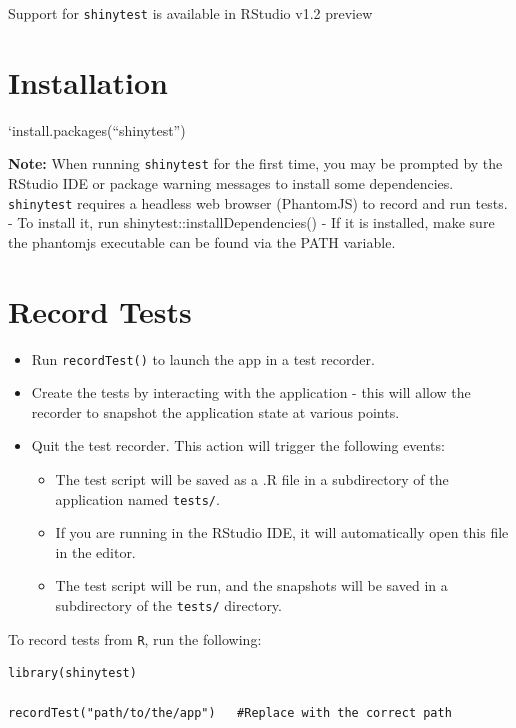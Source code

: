 \documentclass[]{book}
\providecommand{\tightlist}{%
  \setlength{\itemsep}{0pt}\setlength{\parskip}{0pt}}
\theoremstyle{definition}
\theoremstyle{definition}
\theoremstyle{definition}
\theoremstyle{remark}
\begin{document}
Support for \texttt{shinytest} is available in RStudio v1.2 preview

\hypertarget{installation}{%
\section{Installation}\label{installation}}

`install.packages(``shinytest'')

\textbf{Note:} When running \texttt{shinytest} for the first time, you
may be prompted by the RStudio IDE or package warning messages to
install some dependencies. \texttt{shinytest} requires a headless web
browser (PhantomJS) to record and run tests. - To install it, run
shinytest::installDependencies() - If it is installed, make sure the
phantomjs executable can be found via the PATH variable.

\hypertarget{record-tests}{%
\section{Record Tests}\label{record-tests}}

\begin{itemize}
\tightlist
\item
  Run \texttt{recordTest()} to launch the app in a test recorder.
\item
  Create the tests by interacting with the application - this will allow
  the recorder to snapshot the application state at various points.
\item
  Quit the test recorder. This action will trigger the following events:

  \begin{itemize}
  \tightlist
  \item
    The test script will be saved as a .R file in a subdirectory of the
    application named \texttt{tests/}.
  \item
    If you are running in the RStudio IDE, it will automatically open
    this file in the editor.
  \item
    The test script will be run, and the snapshots will be saved in a
    subdirectory of the \texttt{tests/} directory.
  \end{itemize}
\end{itemize}

To record tests from \texttt{R}, run the following:

\begin{verbatim}
library(shinytest)

recordTest("path/to/the/app")   #Replace with the correct path
\end{verbatim}
\end{document}
